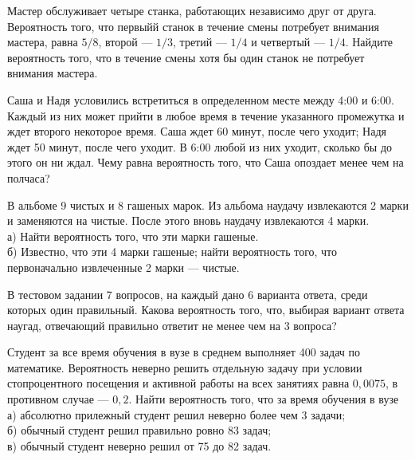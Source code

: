 \newpage\setcounter{zad}{0}



\begin{zkrW}{20}\noindent 
	Мастер обслуживает четыре станка, работающих независимо друг от друга. Вероятность того, что первыйй станок в течение смены потребует внимания мастера, равна $5/8$, второй --- $1/3$, третий --- $1/4$ и четвертый --- $1/4$. Найдите вероятность того, что в течение смены хотя бы один станок не потребует внимания мастера.
 
\end{zkrW}

\begin{zkrW}{20}\noindent 
	Саша и Надя условились встретиться в определенном месте между 4:00 и 6:00. Каждый из них может прийти в любое время в течение указанного промежутка и ждет второго некоторое время. Саша ждет 60 минут, после чего уходит; Надя ждет 50 минут, после чего уходит. В 6:00 любой из них уходит, сколько бы до этого он ни ждал. Чему равна вероятность того, что Саша опоздает менее чем на полчаса?
 
\end{zkrW}

\begin{zkrW}{20}\noindent 
	В альбоме 9 чистых и 8 гашеных марок. Из альбома наудачу извлекаются 2 марки и заменяются на чистые. После этого вновь наудачу извлекаются 4 марки. \\ \indent а) Найти вероятность того, что эти марки гашеные. \\ \indent б) Известно, что эти 4 марки гашеные; найти вероятность того, что первоначально извлеченные 2 марки --- чистые.
 
\end{zkrW}

\begin{zkrW}{20}\noindent 
	В тестовом задании 7 вопросов, на каждый дано 6 варианта ответа, среди которых один правильный. Какова вероятность того, что, выбирая вариант ответа наугад, отвечающий правильно ответит не менее чем на 3 вопроса?
 
\end{zkrW}

\begin{zkrW}{20}\noindent 
	Студент за все время обучения в вузе в среднем выполняет 400 задач по математике. Вероятность неверно решить отдельную задачу при условии стопроцентного посещения и активной работы на всех занятиях равна $0{,}0075$, в противном случае --- $0{,}2$. Найти вероятность того, что за время обучения в вузе \\ \indent а) абсолютно прилежный студент решил неверно более чем 3 задачи; \\ \indent б) обычный студент решил правильно ровно 83 задач; \\ \indent в) обычный студент неверно решил от 75 до 82 задач.
 
\end{zkrW}

